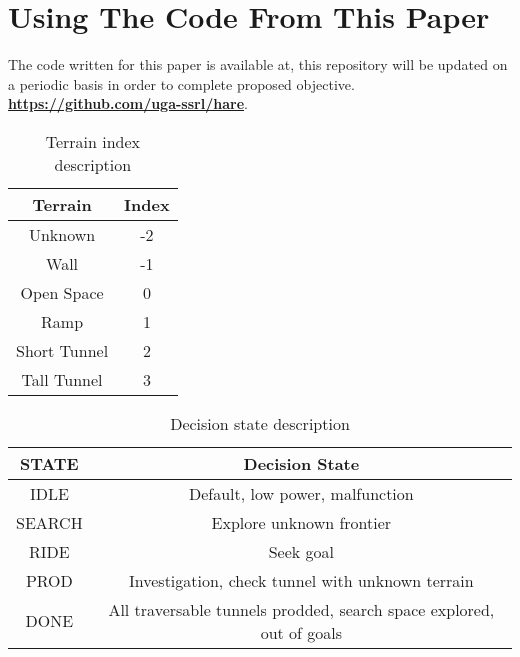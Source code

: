 \appendices
\section{Using The Code From This Paper}        %
The code written for this paper is available at, this repository will be updated on a periodic basis in order to
complete proposed objective.
\textbf{\url{https://github.com/uga-ssrl/hare}}.

\begin{table}[htbp]
\caption{Terrain index description}
\begin{center}
\begin{tabular}{|c|c|}
\hline
\textbf{Terrain}&{\textbf{Index}} \\
\cline{2-4}
\hline
Unknown & -2 \\
\hline
Wall & -1\\
\hline
Open Space & 0\\
\hline
Ramp & 1 \\
\hline
Short Tunnel & 2 \\
\hline
Tall Tunnel & 3 \\
\hline
\end{tabular}
\label{tabl:terrain}
\end{center}
\end{table}


\begin{table}[H]
\caption{Decision state description}
\begin{center}
\begin{tabular}{|c|c|}
\hline
\textbf{STATE}&{\textbf{Decision State}} \\
\cline{2-4}
\hline
IDLE& Default, low power, malfunction\\
\hline
SEARCH& Explore unknown frontier\\
\hline
RIDE& Seek goal\\
\hline
PROD& Investigation, check tunnel with unknown terrain\\
\hline
DONE& All traversable tunnels prodded, search space explored, out of goals\\
\hline
\end{tabular}
\label{tabl:tree-states}
\end{center}
\end{table}




